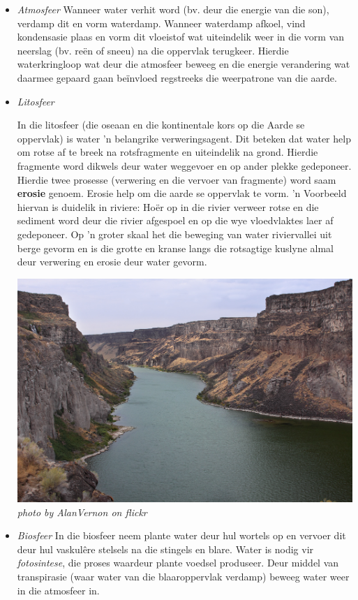       \label{m38138*id334463}\begin{itemize}[noitemsep]
            \label{m38138*uid1}\item \textsl{Atmosfeer}
Wanneer water verhit word (bv. deur die energie van die son), verdamp dit en vorm waterdamp. Wanneer waterdamp afkoel, vind kondensasie plaas en vorm dit vloeistof wat uiteindelik weer in die vorm van neerslag (bv. re\"{e}n of sneeu) na die oppervlak terugkeer. Hierdie waterkringloop wat deur die atmosfeer beweeg en die energie verandering wat daarmee gepaard gaan beïnvloed regstreeks die weerpatrone van die aarde.
\label{m38138*uid2}\item \textsl{Litosfeer} \\
\begin{minipage}{.6\textwidth}
In die litosfeer (die oseaan en die kontinentale kors op die Aarde se oppervlak) is water   'n belangrike verweringsagent. Dit beteken dat water help om rotse af te breek na rotsfragmente en uiteindelik na grond. Hierdie fragmente word dikwels deur water weggevoer en op ander plekke gedeponeer. Hierdie twee prosesse (verwering en die vervoer van fragmente) word saam \textbf{erosie} genoem. Erosie help om die aarde se oppervlak te vorm.   'n Voorbeeld hiervan is duidelik in riviere: Ho\"{e}r op in die rivier verweer rotse en die sediment word deur die rivier afgespoel en op die wye vloedvlaktes laer af gedeponeer. Op   'n groter skaal het die beweging van water riviervallei uit berge gevorm en is die grotte en kranse langs die rotsagtige kuslyne almal deur verwering en erosie deur water gevorm.
\end{minipage}
\begin{minipage}{.4\textwidth}
 \begin{center}
  \includegraphics[width=.6\textwidth]{photos/AlanVernon.jpg}\\
\textsl{photo by AlanVernon on flickr}
 \end{center}
\end{minipage}
\label{m38138*uid3}\item \textsl{Biosfeer}
In die biosfeer neem plante water deur hul wortels op en vervoer dit deur hul vaskul\^{e}re stelsels na die stingels en blare. Water is nodig vir \textsl{fotosintese}, die proses waardeur plante voedsel produseer. Deur middel van transpirasie (waar water van die blaaroppervlak verdamp) beweeg water weer in die atmosfeer in.
\end{itemize}


